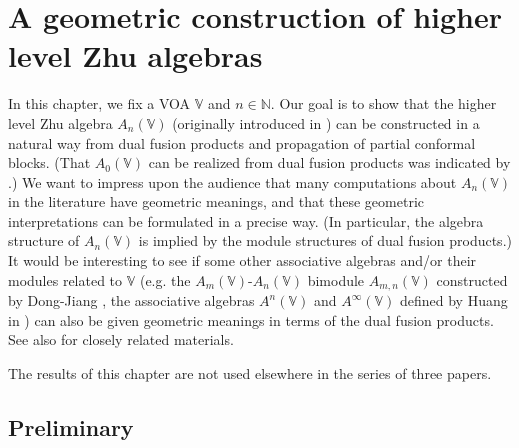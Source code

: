 \documentclass[11pt,b5paper,notitlepage]{article}
\theoremstyle{definition}
\theoremstyle{plain}
\newcommand{\Vbb}{\mathbb V}
\newcommand{\Nbb}{\mathbb N}
\newcommand{\<}{\left\langle}
\renewcommand{\>}{\right\rangle}
\numberwithin{equation}{section}
\begin{document}
\section{A geometric construction of higher level Zhu algebras}\label{lb87}


In this chapter, we fix a VOA $\Vbb$ and $n\in \Nbb$.  Our goal is to show that the higher level Zhu algebra $A_n(\Vbb)$ (originally introduced in \cite{Zhu-modular-invariance,DLM-Zhu}) can be constructed in a natural way from dual fusion products and propagation of partial conformal blocks. (That $A_0(\Vbb)$ can be realized from dual fusion products was indicated by \cite[Prop. 7.2.2 and A.2.7]{NT-P1_conformal_blocks}.) We want to impress upon the audience that many computations about $A_n(\Vbb)$ in the literature have geometric meanings, and that these geometric interpretations can be formulated in a precise way. (In particular, the algebra structure of $A_n(\Vbb)$ is implied by the module structures of dual fusion products.) It would be interesting to see if some other associative algebras and/or their modules related to $\Vbb$ (e.g. the $A_m(\Vbb)$-$A_n(\Vbb)$ bimodule $A_{m,n}(\Vbb)$ constructed by Dong-Jiang \cite{DJ-bimodules}, the associative algebras $A^n(\Vbb)$ and $A^\infty(\Vbb)$ defined by Huang in \cite{Hua-associative}) can also be given geometric meanings in terms of the dual fusion products. See also \cite{Li-regular-Zhu,Li-regular-AnV,Li-regular-bimodules} for closely related materials.


The results of this chapter are not used elsewhere in the series of three papers.


\subsection{Preliminary}
\end{document}
